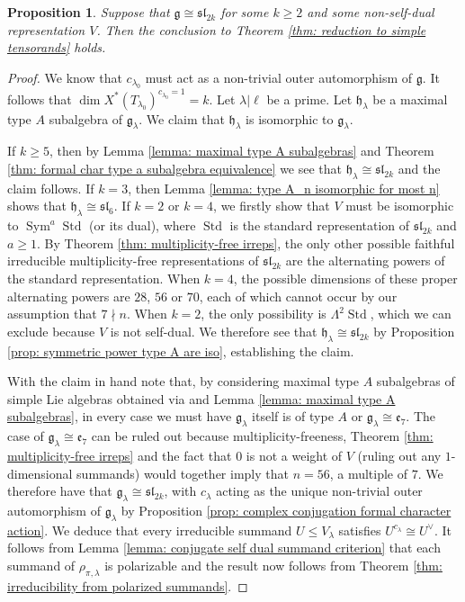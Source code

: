 \documentclass{amsart}
\newtheorem{proposition}[theorem]{Proposition}
\theoremstyle{definition}
\numberwithin{equation}{section} %
\newcommand{\sllie}{\mathfrak{sl}}
\newcommand{\Sym}{\operatorname{Sym}}
\newcommand{\Std}{\operatorname{Std}}
\newcommand{\mf}[1]{\mathfrak{#1}}
\begin{document}
\begin{proposition}\label{prop: sl_2k non-self-dual irred}
Suppose that $\mf{g} \cong \sllie_{2k}$ for some $k \geq 2$ and some non-self-dual representation $V$.
Then the conclusion to Theorem \ref{thm: reduction to simple tensorands} holds.
\end{proposition}
\begin{proof}
We know that $c_{\lambda_0}$ must act as a non-trivial outer automorphism of $\mf{g}$.
It follows that $\dim X^*(T_{\lambda_0})^{c_{\lambda_0} = 1} = k$.
Let $\lambda| \ell$ be a prime.
Let $\mf{h}_\lambda$ be a maximal type $A$ subalgebra of $\mf{g}_\lambda$.
We claim that $\mf{h}_\lambda$ is isomorphic to $\mf{g}_\lambda$.

If $k \geq 5$, then by Lemma \ref{lemma: maximal type A subalgebras} and Theorem \ref{thm: formal char type a subalgebra equivalence} we see that $\mf{h}_\lambda \cong \sllie_{2k}$ and the claim follows.
If $k=3$, then 
Lemma \ref{lemma: type A_n isomorphic for most n} shows that $\mf{h}_\lambda \cong \sllie_6$.
If $k=2$ or $k = 4$, we firstly show that $V$ must be isomorphic to $\Sym^a \Std$ (or its dual), where $\Std$ is the standard representation of $\sllie_{2k}$ and $a \geq 1$.
By Theorem \ref{thm: multiplicity-free irreps}, the only other possible faithful irreducible multiplicity-free representations of $\sllie_{2k}$ are the alternating powers of the standard representation.
When $k=4$, the possible dimensions of these proper alternating powers are $28$, $56$ or $70$, each of which cannot occur by our assumption that $7 \nmid n$.
When $k=2$, the only possibility is $\Lambda^2 \Std$, which we can exclude because $V$ is not self-dual.
We therefore see that $\mf{h}_\lambda \cong \sllie_{2k}$ by Proposition \ref{prop: symmetric power type A are iso}, establishing the claim.

With the claim in hand note that, by considering maximal type $A$ subalgebras of simple Lie algebras obtained via \cite[Table 1]{hui2013monodromy} and Lemma \ref{lemma: maximal type A subalgebras}, in every case we must have $\mf{g}_\lambda$ itself is of type $A$ or $\mf{g}_\lambda \cong \mf{e}_7$.
The case of $\mf{g}_\lambda \cong \mf{e}_7$ can be ruled out because multiplicity-freeness, Theorem \ref{thm: multiplicity-free irreps} and the fact that $0$ is not a weight of $V$ (ruling out any $1$-dimensional summands) would together imply that $n = 56$, a multiple of $7$.
We therefore have that $\mf{g}_\lambda \cong \sllie_{2k}$,
with $c_\lambda$ acting as the unique non-trivial outer automorphism of $\mf{g}_\lambda$ by Proposition \ref{prop: complex conjugation formal character action}.
We deduce that every irreducible summand $U \leq V_\lambda$ satisfies $U^{c_\lambda} \cong U^\vee$.
It follows from Lemma \ref{lemma: conjugate self dual summand criterion} that each summand of $\rho_{\pi,\lambda}$ is polarizable and the result now follows from Theorem \ref{thm: irreducibility from polarized summands}.
\end{proof}
\end{document}
